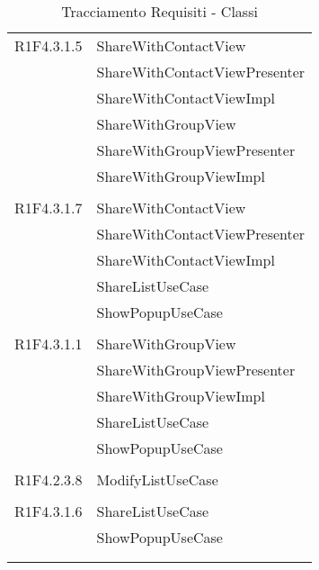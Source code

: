 \begin{center}
\begin{longtable}{|p{7cm}|p{7cm}|}
		R1F4.3.1.5 & ShareWithContactView \\ & ShareWithContactViewPresenter \\ & ShareWithContactViewImpl \\ & ShareWithGroupView \\ & ShareWithGroupViewPresenter \\ & ShareWithGroupViewImpl \\ & \\ \hline
		R1F4.3.1.7 & ShareWithContactView \\ & ShareWithContactViewPresenter \\ & ShareWithContactViewImpl \\ & ShareListUseCase \\ & ShowPopupUseCase \\ & \\ \hline
		R1F4.3.1.1 & ShareWithGroupView \\ & ShareWithGroupViewPresenter \\ & ShareWithGroupViewImpl \\ & ShareListUseCase \\ & ShowPopupUseCase \\ & \\ \hline
		R1F4.2.3.8 & ModifyListUseCase \\ & \\ \hline
		R1F4.3.1.6 & ShareListUseCase \\ & ShowPopupUseCase \\ & \\ \hline
	\caption[Tracciamento Requisiti - Classi]{Tracciamento Requisiti - Classi}
	\label{tabella: Tracciamento Requisiti - Classi}
	\end{longtable}
\end{center}
